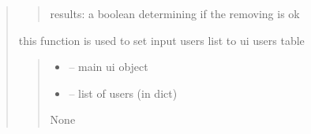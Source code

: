 \documentclass[letterpaper,10pt,english]{sphinxmanual}
\begin{document}
\begin{quote}
\begin{savenotes}
\begin{fulllineitems}
\begin{quote}
\begin{description}
\begin{itemize}
\end{itemize}

\sphinxAtStartPar
results: a boolean determining if the removing is ok

\end{description}\end{quote}

\end{fulllineitems}\end{savenotes}


\begin{savenotes}\begin{fulllineitems}
\label{\detokenize{setting/backend/user_management_funcs:oxin.backend.user_management_funcs.set_users_on_ui}}
\pysigstartsignatures
{}
\pysigstopsignatures
\sphinxAtStartPar
this function is used to set input users list to ui users table
\begin{quote}\begin{description}
\begin{itemize}
\item {} 
\sphinxAtStartPar
{} – main ui object

\item {} 
\sphinxAtStartPar
{} – list of users (in dict)

\end{itemize}

\sphinxAtStartPar
None

\end{description}\end{quote}

\end{fulllineitems}\end{savenotes}



\end{quote}
\end{document}
